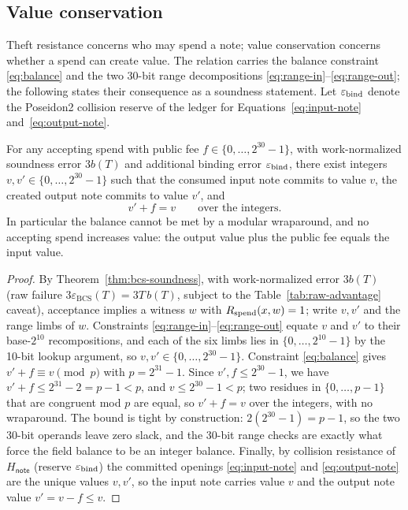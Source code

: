 \subsection{Value conservation}
\label{sec:value-conservation}

Theft resistance concerns who may spend a note; value conservation concerns
whether a spend can create value.  The relation carries the balance constraint
\eqref{eq:balance} and the two 30-bit range decompositions
\eqref{eq:range-in}--\eqref{eq:range-out}; the following states their
consequence as a soundness statement.  Let \(\varepsilon_{\rm bind}\) denote
the Poseidon2 collision reserve of the ledger for
Equations~\eqref{eq:input-note} and~\eqref{eq:output-note}.

\begin{theorem}
\label{thm:value-conservation}
For any accepting spend with public fee \(f\in\{0,\dots,2^{30}-1\}\), with
work-normalized soundness error \(3b(T)\) and additional binding error
\(\varepsilon_{\rm bind}\), there exist integers \(v,v'\in\{0,\dots,2^{30}-1\}\)
such that the consumed input note commits to value \(v\), the created output
note commits to value \(v'\), and
\[
 v' + f = v \qquad\text{over the integers.}
\]
In particular the balance cannot be met by a modular wraparound, and no
accepting spend increases value: the output value plus the public fee equals
the input value.
\end{theorem}

\begin{proof}
By Theorem~\ref{thm:bcs-soundness}, with work-normalized error \(3b(T)\) (raw
failure \(3\varepsilon_{\mathrm{BCS}}(T)=3T\,b(T)\), subject to the
Table~\ref{tab:raw-advantage} caveat), acceptance implies a witness \(w\) with
\(R_{\mathrm{spend}}(x,w)=1\); write \(v,v'\) and the range limbs of \(w\).  Constraints \eqref{eq:range-in}--\eqref{eq:range-out} equate \(v\) and
\(v'\) to their base-\(2^{10}\) recompositions, and each of the six limbs lies
in \(\{0,\dots,2^{10}-1\}\) by the 10-bit lookup argument, so
\(v,v'\in\{0,\dots,2^{30}-1\}\).  Constraint \eqref{eq:balance} gives
\(v'+f\equiv v \pmod p\) with \(p=2^{31}-1\).  Since
\(v',f\le2^{30}-1\), we have \(v'+f\le2^{31}-2=p-1<p\), and \(v\le2^{30}-1<p\);
two residues in \(\{0,\dots,p-1\}\) that are congruent mod \(p\) are equal, so
\(v'+f=v\) over the integers, with no wraparound.  The bound is tight by
construction: \(2(2^{30}-1)=p-1\), so the two 30-bit operands leave zero slack,
and the 30-bit range checks are exactly what force the field balance to be an
integer balance.  Finally, by collision
resistance of \(H_{\mathsf{note}}\) (reserve \(\varepsilon_{\rm bind}\)) the
committed openings \eqref{eq:input-note} and \eqref{eq:output-note} are the
unique values \(v,v'\), so the input note carries value \(v\) and the output
note value \(v'=v-f\le v\).
\end{proof}

